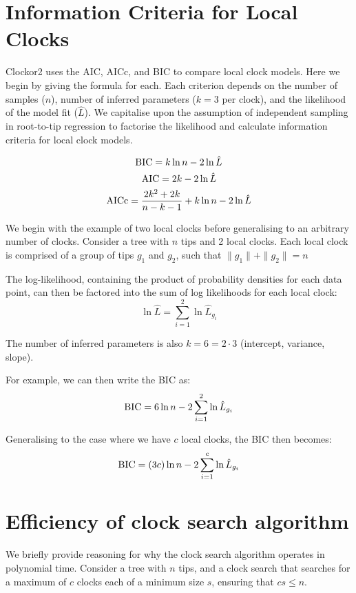 \documentclass{article}
\begin{document}
\section{Information Criteria for Local Clocks}
Clockor2 uses the AIC, AICc, and BIC to compare local clock models. Here we begin by giving the formula for each. Each criterion depends on the number of samples ($n$), number of inferred parameters ($k=3$ per clock), and the likelihood of the model fit ($\hat{L}$). We capitalise upon the assumption of independent sampling in root-to-tip regression to factorise the likelihood and calculate information criteria for local clock models.

\begin{equation}
    \textnormal{BIC} = k\ln{n} - 2\ln{\hat{L}}
\end{equation}
\begin{equation}
    \textnormal{AIC} = 2k - 2\ln{\hat{L}}
\end{equation}
\begin{equation}
    \textnormal{AICc} = \frac{2k^2+2k}{n-k-1} + k\ln{n} - 2\ln{\hat{L}}
\end{equation}

We begin with the example of two local clocks before generalising to an arbitrary number of clocks. Consider a tree with $n$ tips and 2 local clocks. Each local clock is comprised of a group of tips $g_1$ and $g_2$, such that $ \|g_1\| + \|g_2\| = n $

The log-likelihood, containing the product of probability densities for each data point, can then be factored into the sum of log likelihoods for each local clock:
\begin{equation}
    \ln{\hat{L}} = \sum_{i=1}^{2} \ln{\hat{L}_{g_{i}}}
\end{equation}

The number of inferred parameters is also $k = 6 = 2\cdot3$ (intercept, variance, slope).

For example, we can then write the BIC as:
\begin{equation}
    \textnormal{BIC} = 6\ln{n} - 2\sum_{i=1}^{2} \ln{\hat{L}_{g_{i}}}
\end{equation}

Generalising to the case where we have $c$ local clocks, the BIC then becomes:
\begin{equation}
    \textnormal{BIC} = (3c)\ln{n} - 2\sum_{i=1}^{c} \ln{\hat{L}_{g_{i}}}
\end{equation}

\section{Efficiency of clock search algorithm}
We briefly provide reasoning for why the clock search algorithm operates in polynomial time.
Consider a tree with $n$ tips, and a clock search that searches for a maximum of $c$ clocks each of a minimum size $s$, ensuring that $cs \le n$.
\end{document}
